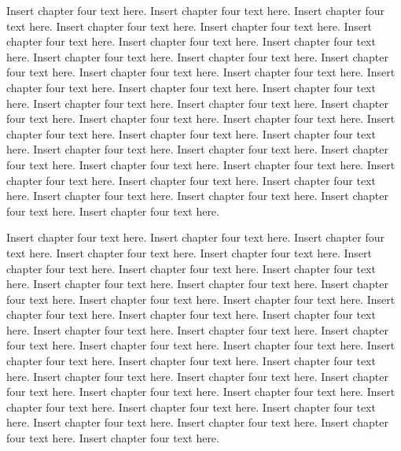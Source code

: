 Insert chapter four text here. Insert chapter four text here. Insert chapter four text here. Insert chapter four text here. Insert chapter four text here. Insert chapter four text here. Insert chapter four text here. Insert chapter four text here. Insert chapter four text here. Insert chapter four text here. Insert chapter four text here. Insert chapter four text here. Insert chapter four text here. Insert chapter four text here. Insert chapter four text here. Insert chapter four text here. Insert chapter four text here. Insert chapter four text here. Insert chapter four text here. Insert chapter four text here. Insert chapter four text here. Insert chapter four text here. Insert chapter four text here. Insert chapter four text here. Insert chapter four text here. Insert chapter four text here. Insert chapter four text here. Insert chapter four text here. Insert chapter four text here. Insert chapter four text here. Insert chapter four text here. Insert chapter four text here. Insert chapter four text here. Insert chapter four text here. Insert chapter four text here. Insert chapter four text here.

Insert chapter four text here. Insert chapter four text here. Insert chapter four text here. Insert chapter four text here. Insert chapter four text here. Insert chapter four text here. Insert chapter four text here. Insert chapter four text here. Insert chapter four text here. Insert chapter four text here. Insert chapter four text here. Insert chapter four text here. Insert chapter four text here. Insert chapter four text here. Insert chapter four text here. Insert chapter four text here. Insert chapter four text here. Insert chapter four text here. Insert chapter four text here. Insert chapter four text here. Insert chapter four text here. Insert chapter four text here. Insert chapter four text here. Insert chapter four text here. Insert chapter four text here. Insert chapter four text here. Insert chapter four text here. Insert chapter four text here. Insert chapter four text here. Insert chapter four text here. Insert chapter four text here. Insert chapter four text here. Insert chapter four text here. Insert chapter four text here. Insert chapter four text here. Insert chapter four text here.

